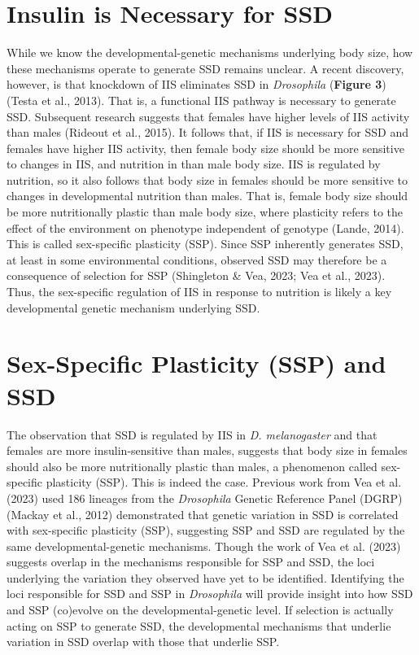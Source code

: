 \documentclass[12pt,reqno,oneside]{report}
\begin{document}
\section{Insulin is Necessary for SSD}

While we know the developmental-genetic mechanisms underlying body size, how these mechanisms operate to generate SSD remains unclear. A recent discovery, however, is that knockdown of IIS eliminates SSD in \textit{Drosophila} (\textbf{Figure 3}) (Testa et al., 2013). That is, a functional IIS pathway is necessary to generate SSD. Subsequent research suggests that females have higher levels of IIS activity than males (Rideout et al., 2015). It follows that, if IIS is necessary for SSD and females have higher IIS activity, then female body size should be more sensitive to changes in IIS, and nutrition in  than male body size. IIS is regulated by nutrition, so it also follows that body size in females should be more sensitive to changes in developmental nutrition than males. That is, female body size should be more nutritionally plastic than male body size, where plasticity refers to the effect of the environment on phenotype independent of genotype (Lande, 2014). This is called sex-specific plasticity (SSP). Since SSP inherently generates SSD, at least in some environmental conditions, observed SSD may therefore be a consequence of selection for SSP (Shingleton \& Vea, 2023; Vea et al., 2023). Thus, the sex-specific regulation of IIS in response to nutrition is likely a key developmental genetic mechanism underlying SSD.

\section{Sex-Specific Plasticity (SSP) and SSD}

The observation that SSD is regulated by IIS in \textit{D. melanogaster} and that females are more insulin-sensitive than males, suggests that body size in females should also be more nutritionally plastic than males, a phenomenon called sex-specific plasticity (SSP). This is indeed the case. Previous work from Vea et al. (2023) used 186 lineages from the \textit{Drosophila} Genetic Reference Panel (DGRP) (Mackay et al., 2012) demonstrated that genetic variation in SSD is correlated with sex-specific plasticity (SSP), suggesting SSP and SSD are regulated by the same developmental-genetic mechanisms. Though the work of Vea et al. (2023) suggests overlap in the mechanisms responsible for SSP and SSD, the loci underlying the variation they observed have yet to be identified. Identifying the loci responsible for SSD and SSP in \textit{Drosophila} will provide insight into how SSD and SSP (co)evolve on the developmental-genetic level. If selection is actually acting on SSP to generate SSD, the developmental mechanisms that underlie variation in SSD overlap with those that underlie SSP. 
\end{document}

